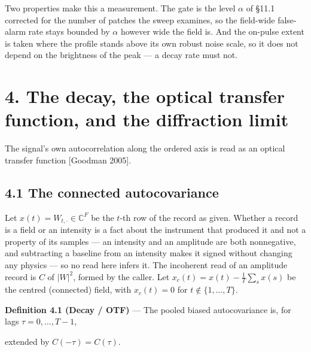 \documentclass[10pt,letterpaper,twocolumn]{article}
\begin{document}
Two properties make this a measurement. The gate is the level \(\alpha\) of §11.1 corrected for the number of patches the sweep examines, so the field-wide false-alarm rate stays bounded by \(\alpha\) however wide the field is. And the on-pulse extent is taken where the profile stands above its own robust noise scale, so it does not depend on the brightness of the peak --- a decay rate must not.

\section{4. The decay, the optical transfer function, and the diffraction limit}\label{4-the-decay-the-optical-transfer-function-and-the-diffraction-limit}

The signal's own autocorrelation along the ordered axis is read as an optical transfer function {[}Goodman 2005{]}.

\subsection{4.1 The connected autocovariance}\label{41-the-connected-autocovariance}

Let \(x(t)=W_{t,\cdot}\in\mathbb{C}^F\) be the \(t\)-th row of the record as given. Whether a record is a field or an intensity is a fact about the instrument that produced it and not a property of its samples --- an intensity and an amplitude are both nonnegative, and subtracting a baseline from an intensity makes it signed without changing any physics --- so no read here infers it. The incoherent read of an amplitude record is \(C\) of \(|W|^2\), formed by the caller. Let \(x_c(t)=x(t)-\frac1T\sum_s x(s)\) be the centred (connected) field, with \(x_c(t)=0\) for \(t\notin\{1,\dots,T\}\).

\textbf{Definition 4.1 (Decay / OTF)} --- The pooled biased autocovariance is, for lags \(\tau=0,\dots,T-1\),


extended by \(C(-\tau)=C(\tau)\).
\end{document}
